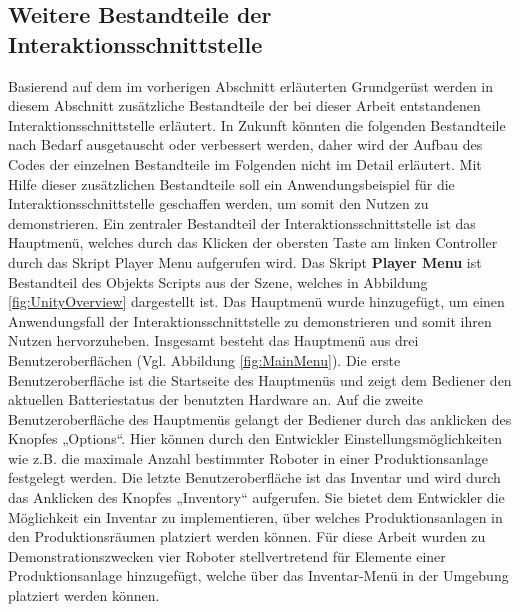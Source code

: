 \subsection{Weitere Bestandteile der Interaktionsschnittstelle}\label{sec:WeitereTeileInteraktion}
Basierend auf dem im vorherigen Abschnitt erläuterten Grundgerüst werden in diesem Abschnitt zusätzliche Bestandteile der bei dieser Arbeit entstandenen Interaktionsschnittstelle erläutert. In Zukunft könnten die folgenden Bestandteile nach Bedarf ausgetauscht oder verbessert werden, daher wird der Aufbau des Codes der einzelnen Bestandteile im Folgenden nicht im Detail erläutert. Mit Hilfe dieser zusätzlichen Bestandteile soll ein Anwendungsbeispiel für die Interaktionsschnittstelle geschaffen werden, um somit den Nutzen zu demonstrieren.
\newline\newline
Ein zentraler Bestandteil der Interaktionsschnittstelle ist das Hauptmenü, welches durch das Klicken der obersten Taste am linken Controller durch das Skript Player Menu aufgerufen wird. Das Skript \textbf{Player Menu} ist Bestandteil des Objekts Scripts aus der Szene, welches in Abbildung \ref{fig:UnityOverview} dargestellt ist. Das Hauptmenü wurde hinzugefügt, um einen Anwendungsfall der Interaktionsschnittstelle zu demonstrieren und somit ihren Nutzen hervorzuheben. Insgesamt besteht das Hauptmenü aus drei Benutzeroberflächen (Vgl. Abbildung \ref{fig:MainMenu}). Die erste Benutzeroberfläche ist die Startseite des Hauptmenüs und zeigt dem Bediener den aktuellen Batteriestatus der benutzten Hardware an. Auf die zweite Benutzeroberfläche des Hauptmenüs gelangt der Bediener durch das anklicken des Knopfes „Options“. Hier können durch den Entwickler Einstellungsmöglichkeiten wie z.B. die maximale Anzahl bestimmter Roboter in einer Produktionsanlage festgelegt werden. Die letzte Benutzeroberfläche ist das Inventar und wird durch das Anklicken des Knopfes „Inventory“ aufgerufen. Sie bietet dem Entwickler die Möglichkeit ein Inventar zu implementieren, über welches Produktionsanlagen in den Produktionsräumen platziert werden können. Für diese Arbeit wurden zu Demonstrationszwecken vier Roboter stellvertretend für Elemente einer Produktionsanlage hinzugefügt, welche über das Inventar-Menü in der Umgebung platziert werden können.
